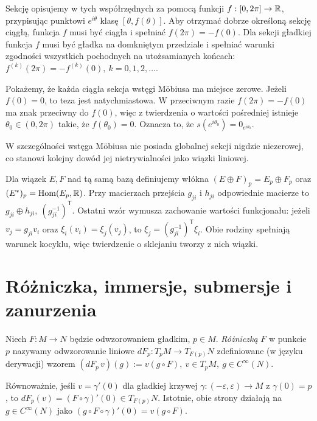 \begin{przyklad}
Sekcję opisujemy w tych współrzędnych za pomocą
funkcji $f:[0,2\pi]\to\mathbb{R}$, przypisując punktowi
$e^{i\theta}$ klasę $[\theta,f(\theta)]$.
Aby otrzymać dobrze określoną sekcję ciągłą,
funkcja $f$ musi być ciągła i spełniać $f(2\pi)=-f(0)$.
Dla sekcji gładkiej funkcja $f$ musi być gładka na domkniętym
przedziale i spełniać warunki zgodności wszystkich pochodnych
na utożsamianych końcach: $f^{(k)}(2\pi)=-f^{(k)}(0), \ k=0,1,2,\ldots$.

Pokażemy, że każda ciągła sekcja wstęgi Möbiusa
ma miejsce zerowe. Jeżeli $f(0)=0$, to teza
jest natychmiastowa. W przeciwnym razie
$f(2\pi)=-f(0)$ ma znak przeciwny do $f(0)$,
więc z twierdzenia o wartości pośredniej istnieje
$\theta_0\in(0,2\pi)$ takie, że $f(\theta_0)=0$.
Oznacza to, że $s(e^{i\theta_0})=0_{e^{i\theta_0}}$.

W szczególności wstęga Möbiusa nie posiada
globalnej sekcji nigdzie niezerowej, co stanowi
kolejny dowód jej nietrywialności jako wiązki
liniowej.
\end{przyklad}


\begin{definicja}
Dla wiązek $E,F$ nad tą samą bazą definiujemy włókna
$(E\oplus F)_p=E_p\oplus F_p$ oraz
$(E^*)_p=\mathrm{Hom}(E_p,\mathbb{R})$. Przy macierzach przejścia $g_{ji}$
i $h_{ji}$ odpowiednie macierze to $g_{ji}\oplus h_{ji},\ (g_{ji}^{-1})^{\mathsf T}$.
Ostatni wzór wymusza zachowanie wartości funkcjonału:
jeżeli $v_j=g_{ji}v_i$ oraz $\xi_i(v_i)=\xi_j(v_j)$, to
$\xi_j=(g_{ji}^{-1})^{\mathsf T}\xi_i$. Obie rodziny spełniają
warunek kocyklu, więc twierdzenie o sklejaniu tworzy z nich wiązki.
\end{definicja}



\section{Różniczka, immersje, submersje i zanurzenia}

\begin{definicja}
Niech $F\colon M\to N$ będzie odwzorowaniem gładkim, $p\in M$. \emph{Różniczką} $F$ w
punkcie $p$ nazywamy odwzorowanie liniowe $dF_p\colon T_pM\to T_{F(p)}N$ zdefiniowane (w
języku derywacji) wzorem $(dF_p\,v)(g):=v(g\circ F), \ v\in T_pM,\ g\in C^\infty(N)$.

Równoważnie, jeśli $v=\gamma'(0)$ dla gładkiej krzywej
$\gamma\colon(-\varepsilon,\varepsilon)\to M$ z $\gamma(0)=p$, to $dF_p(v)=(F\circ\gamma)'(0)\in T_{F(p)}N$.
Istotnie, obie strony działają na $g\in C^\infty(N)$ jako
$(g\circ F\circ\gamma)'(0)=v(g\circ F)$. 
\end{definicja}

